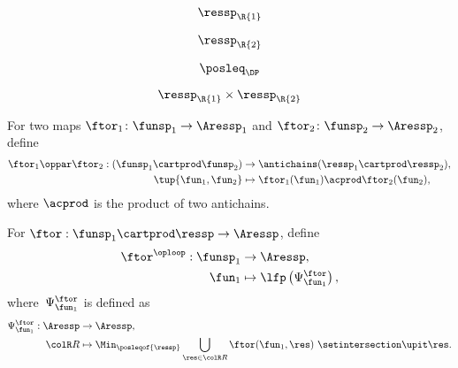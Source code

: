 \begin{forslides}



    \begin{equation}
        \label{eq:ressp1}
        \ressp_\R{1}
    \end{equation}

    \begin{equation}
        \label{eq:ressp2}
        \ressp_\R{2}
    \end{equation}

    \begin{equation}
        \label{eq:posleqDP}
        \posleq_\DP
    \end{equation}

    \begin{equation}
        \label{eq:ressp12}
        \ressp_\R{1}\times \ressp_\R{2}
    \end{equation}
\end{forslides}

\begin{definition}
     \label{def:oppar}
    For two maps $\ftor_{1}\colon\funsp_{1}\rightarrow\Aressp_{1}$ and $\ftor_{2}\colon\funsp_{2}\rightarrow\Aressp_{2}$, define
    \begin{align}
        \ftor_{1}\oppar\ftor_{2}:(\funsp_{1}\cartprod\funsp_{2}) & \rightarrow\antichains(\ressp_{1}\cartprod\ressp_{2}),\label{eq:oppar} \\
        \tup{ \fun_{1},\fun_{2}}                                 & \mapsto\ftor_{1}(\fun_{1})\acprod\ftor_{2}(\fun_{2}),\nonumber
    \end{align}
    where $\acprod$ is the product of two antichains.
\end{definition}

\begin{definition}
    \label{def:oploop1}
    For $\ftor:\funsp_{1}\cartprod\ressp\rightarrow\Aressp$,
    define
    \begin{align}
        \ftor^{\oploop}:\funsp_{1} & \rightarrow\Aressp,\nonumber \\
        \fun_{1}                   & \mapsto\lfp\left(\Psi_{\fun_{1}}^{\ftor}\right),
    \end{align}
    where~$\Psi_{\fun_{1}}^{\ftor}$ is defined as
    \begin{align}
        \Psi_{\fun_{1}}^{\ftor}:\Aressp & \rightarrow\Aressp,\nonumber \\
        {\colR R}                       & \mapsto\Min_{\posleqof{\ressp}}\bigcup_{\res\in{\colR R}}\ftor(\fun_{1},\res)\ \setintersection\upit\res.
        \label{eq:phi}
    \end{align}
\end{definition}

